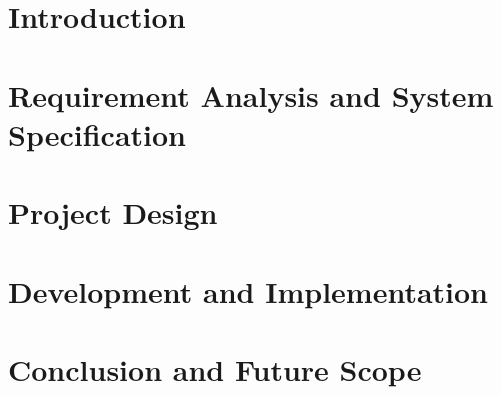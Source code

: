 \documentclass[12pt,includeheadfoot,a4paper]{report}
\begin{document}


\thispagestyle{empty}
\pagetitle
\newpage
{}
\cfoot{\thepage}
\newpage

\newpage

\newpage

\newpage

\newpage
\tableofcontents
\newpage
\listoffigures

\newpage


\cfoot{\thepage}


\newpage
\chapter{Introduction}


\chapter{Requirement Analysis and System Specification}


%
%
\chapter{Project Design}
%
%

%
\chapter{Development and Implementation}

%
%
%
\chapter{Conclusion and Future Scope}

%

%

\end{document}
